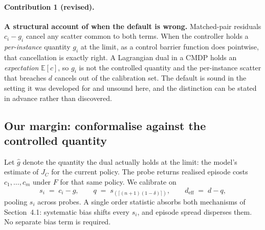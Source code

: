 
\paragraph{Contribution 1 (revised).}
\textbf{A structural account of when the default is wrong.}
Matched-pair residuals $c_i - g_i$ cancel any scatter common to both terms.
When the controller holds a \emph{per-instance} quantity $g_i$ at the limit,
as a control barrier function does pointwise, that cancellation is exactly
right. A Lagrangian dual in a CMDP holds an \emph{expectation}
$\mathbb{E}[c]$, so $g_i$ is not the controlled quantity and the per-instance
scatter that breaches $d$ cancels out of the calibration set. The default is
sound in the setting it was developed for and unsound here, and the
distinction can be stated in advance rather than discovered.

\subsection{Our margin: conformalise against the controlled quantity}
\label{sec:residual}

Let $\hat g$ denote the quantity the dual actually holds at the limit: the
model's estimate of $J_C$ for the current policy. The probe returns realised
episode costs $c_1,\dots,c_m$ under $F$ for that same policy. We calibrate on
\begin{equation}
  s_i \;=\; c_i - \hat g,
  \qquad
  q \;=\; s_{(\lceil (n+1)(1-\delta)\rceil)},
  \qquad
  d_{\mathrm{eff}} \;=\; d - q ,
  \label{eq:residual}
\end{equation}
pooling $s_i$ across probes. A single order statistic absorbs both mechanisms
of Section~4.1: systematic bias shifts every $s_i$, and episode spread
disperses them. No separate bias term is required.

